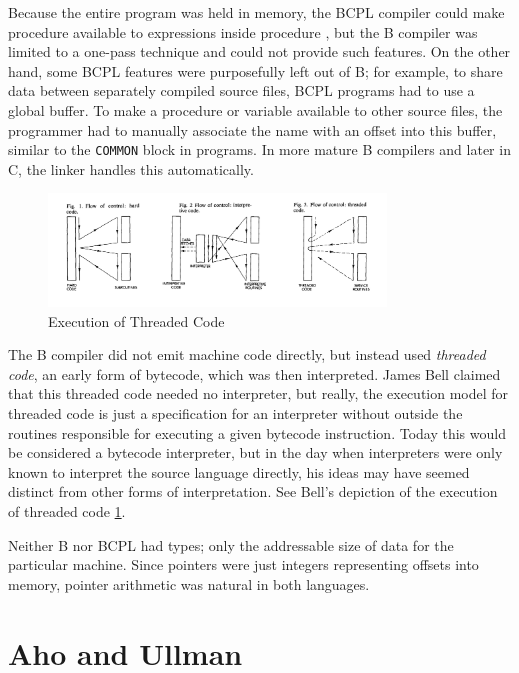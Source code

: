 Because the entire program was held in memory, the BCPL compiler could make
procedure  available to expressions inside procedure ,
but the B compiler was limited to a one-pass technique and could not provide such features.
On the other hand, some BCPL features were purposefully left out of B; for example,
to share data between separately compiled source files, BCPL programs had to use
a global buffer. To make a procedure or variable available to other source files,
the programmer had to manually associate the name with an offset into this buffer,
similar to the \texttt{COMMON} block in \ftn{} programs.
In more mature B compilers and later in C, the linker handles this automatically.

\begin{figure}[h]
    \centering
    \includegraphics[width=0.8\textwidth]{resource/software/unix/bell-threaded-code-figures.png}
    \caption{Execution of Threaded Code\cite{bell_threaded_code_1973}}
    \label{fig:bell-threaded-code}
\end{figure}

The B compiler did not emit machine code directly, but instead used
\textit{threaded code}\cite{bell_threaded_code_1973}, an early form of \gls{bytecode},
which was then interpreted.
James Bell claimed that this threaded code needed no interpreter,
but really, the execution model for threaded code is just a specification
for an interpreter without outside the routines responsible for executing a given
bytecode instruction.
Today this would be considered a bytecode interpreter, but in the day when interpreters
were only known to interpret the source language directly, his ideas may have seemed
distinct from other forms of interpretation.
See Bell's depiction of the execution of threaded code \ref{fig:bell-threaded-code}.

Neither B nor BCPL had types; only the addressable size of data for the particular machine.
Since pointers were just integers representing offsets into memory, pointer arithmetic
was natural in both languages.

\section{Aho and Ullman}

